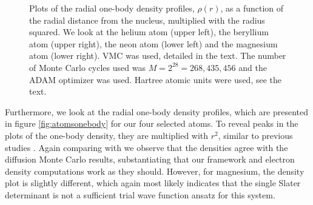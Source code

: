 \begin{figure}
	\caption{Plots of the radial one-body density profiles, $\rho(r)$, as a function of the radial distance from the nucleus, multiplied with the radius squared. We look at the helium atom (upper left), the beryllium atom (upper right), the neon atom (lower left) and the magnesium atom (lower right). VMC was used, detailed in the text. The number of Monte Carlo cycles used was $M=2^{28}=268,435,456$ and the ADAM optimizer was used. Hartree atomic units were used, see the text.}
	\label{fig:atomsonebody}
\end{figure}

Furthermore, we look at the radial one-body density profiles, which are presented in figure \eqref{fig:atomsonebody} for our four selected atoms. To reveal peaks in the plots of the one-body density, they are multiplied with $r^2$, similar to previous studies \supercite{hogberget_quantum_2013}. Again comparing with \citet{hogberget_quantum_2013} we observe that the densities agree with the diffusion Monte Carlo results, substantiating that our framework and electron density computations work as they should. However, for magnesium, the density plot is slightly different, which again most likely indicates that the single Slater determinant is not a sufficient trial wave function ansatz for this system.

